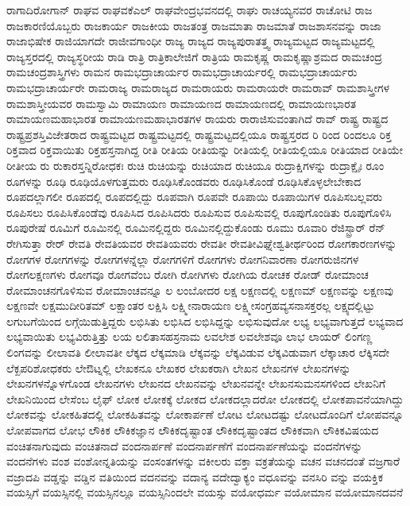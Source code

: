 {ರಾಗಾದಿರೋಗಾನ್
ರಾಘವ
ರಾಘವಕೆಎಲ್
ರಾಘವೇಂದ್ರಭವನದಲ್ಲಿ
ರಾಘು
ರಾಚಯ್ಯನವರ
ರಾಚೋಟಿ
ರಾಜ
ರಾಜಕಾರಣಿಯೊಬ್ಬರು
ರಾಜಕಾರ್ಯ
ರಾಜಕೀಯ
ರಾಜತಂತ್ರ
ರಾಜಮಾತಾ
ರಾಜಮಾತೆ
ರಾಜಶಾಸನವನ್ನು
ರಾಜಾ
ರಾಜಾಭಿಷೇಕ
ರಾಜಿಯಾಗದೇ
ರಾಜೀವಗಾಂಧೀ
ರಾಜ್ಯ
ರಾಜ್ಯದ
ರಾಜ್ಯಪುರಾತತ್ತ್ವ
ರಾಜ್ಯಮಟ್ಟದ
ರಾಜ್ಯಮಟ್ಟದಲ್ಲಿ
ರಾಜ್ಯಸ್ತರದಲ್ಲಿ
ರಾಜ್ಯಸ್ಥರೀಯ
ರಾಡಿ
ರಾತ್ರಿ
ರಾತ್ರಿಕಾಲೇಜಿಗೆ
ರಾತ್ರಿಯ
ರಾಮಕೃಷ್ಣ
ರಾಮಕೃಷ್ಣಾಶ್ರಮದ
ರಾಮಚಂದ್ರ
ರಾಮಚಂದ್ರಶಾಸ್ತ್ರಿಗಳು
ರಾಮನ
ರಾಮಭದ್ರಾಚಾರ್ಯರ
ರಾಮಭದ್ರಾಚಾರ್ಯರಲ್ಲಿ
ರಾಮಭದ್ರಾಚಾರ್ಯರು
ರಾಮಭದ್ರಾಚಾರ್ಯರೇ
ರಾಮರಾಜ್ಯ
ರಾಮರಾಜ್ಯದ
ರಾಮರಾಯರು
ರಾಮರಾಯರೇ
ರಾಮರಾವ್
ರಾಮಶಾಸ್ತ್ರೀಗಳ
ರಾಮಶಾಸ್ತ್ರೀಯವರ
ರಾಮಸ್ವಾಮಿ
ರಾಮಾಯಣ
ರಾಮಾಯಣದ
ರಾಮಾಯಣದಲ್ಲಿ
ರಾಮಾಯಣಭಾರತ
ರಾಮಾಯಣಮಹಾಭಾರತ
ರಾಮಾಯಣಮಹಾಭಾರತಗಳ
ರಾಯರು
ರಾರಾಜಿಸುವಂತಾಗಿದೆ
ರಾವ್
ರಾಷ್ಟ್ರ
ರಾಷ್ಟ್ರದ
ರಾಷ್ಟ್ರಪ್ರಶಸ್ತಿವಿಜೇತರಾದ
ರಾಷ್ಟ್ರಮಟ್ಟದ
ರಾಷ್ಟ್ರಮಟ್ಟದಲ್ಲಿ
ರಾಷ್ಟ್ರಮಟ್ಟದಲ್ಲಿಯೂ
ರಾಷ್ಟ್ರಸ್ತರದ
ರಿ
ರಿಂದ
ರಿಂದಲೂ
ರಿಕ್ತ
ರಿಕ್ತವಾದ
ರಿಕ್ತವಾಯಿತು
ರಿಕ್ತಹಸ್ತನಾಗಿದ್ದ
ರೀತಿ
ರೀತಿಯ
ರೀತಿಯನ್ನು
ರೀತಿಯಲ್ಲಿ
ರೀತಿಯಲ್ಲಿಯೂ
ರೀತಿಯಾದ
ರೀತಿಯೇ
ರೀತೀಯ
ರು
ರುಕಾರಸ್ತನ್ನಿರೋಧಕಃ
ರುಚಿ
ರುಚಿಯನ್ನು
ರುಚಿಯಾದ
ರುಚಿಯೂ
ರುದ್ರಾಕ್ಷಿಗಳನ್ನು
ರುದ್ರಾಕ್ಷೈಃ
ರೂಂ
ರೂಗಳನ್ನು
ರೂಢಿ
ರೂಢಿಯೊಳಗುತ್ತಮರು
ರೂಢಿಸಿಕೊಂಡವರು
ರೂಢಿಸಿಕೊಂಡೆ
ರೂಢಿಸಿಕೊಳ್ಳಲೇಬೇಕಾದ
ರೂಪದಲ್ಲಾಗಲೀ
ರೂಪದಲ್ಲಿ
ರೂಪದಲ್ಲಿದ್ದು
ರೂಪವಾಗಿ
ರೂಪವೇ
ರೂಪಾಯಿ
ರೂಪಾಯಿಗಳ
ರೂಪಿಸಬಲ್ಲವರು
ರೂಪಿಸಲು
ರೂಪಿಸಿಕೊಂಡೆವು
ರೂಪಿಸಿದ
ರೂಪಿಸಿದರು
ರೂಪಿಸುವ
ರೂಪಿಸುವಲ್ಲಿ
ರೂಪುಗೊಂಡಿತು
ರೂಪುಗೊಳಿಸಿ
ರೂಪುರೇಷೆ
ರೂಮಿಗೆ
ರೂಮಿನಲ್ಲಿ
ರೂಮಿನಲ್ಲಿದ್ದರು
ರೂಮಿನಲ್ಲಿದ್ದುಕೊಂಡು
ರೂಮು
ರೂವಾರಿ
ರೆಜಿಸ್ಟ್ರಾರ್
ರೆನ್
ರೇಗಿಸುತ್ತಾ
ರೇರ್
ರೇವತಿ
ರೇವತಿಯವರ
ರೇವತಿಯವರು
ರೇವತೀ
ರೇವತೀವಿಘ್ನೇಶ್ವತೀರ್ಥರಿಂದ
ರೋಗಕಾರಣಗಳನ್ನು
ರೋಗಗಳ
ರೋಗಗಳನ್ನು
ರೋಗಗಳನ್ನೆಲ್ಲಾ
ರೋಗಗಳಿಗೆ
ರೋಗಗಳು
ರೋಗನಿವಾರಣಾ
ರೋಗರುಜಿನಗಳ
ರೋಗಲಕ್ಷಣಗಳು
ರೋಗವೂ
ರೋಗವೆಂಬ
ರೋಗಿ
ರೋಗಿಗಳು
ರೋಗಿಯ
ರೋಚಕ
ರೋಡ್
ರೋಮಾಂಚ
ರೋಮಾಂಚನಗೊಳಿಸುವ
ರೋಮಾಂಚವನ್ನೂ
ಲ
ಲಂಬೋದರ
ಲಕ್ಷ
ಲಕ್ಷಣದಲ್ಲಿ
ಲಕ್ಷಣಮ್
ಲಕ್ಷಣವನ್ನು
ಲಕ್ಷಣವು
ಲಕ್ಷಣವೇ
ಲಕ್ಷಮುದೀರಿತಮ್
ಲಕ್ಷಾಂತರ
ಲಕ್ಷಿಸಿ
ಲಕ್ಷ್ಮೀನಾರಾಯಣ
ಲಕ್ಷ್ಮೀಸಂಗ್ರಹವ್ಯಸನಾಸಕ್ತರಲ್ಲ
ಲಕ್ಷ್ಯದಲ್ಲಿಟ್ಟು
ಲಗುಬಗೆಯಿಂದ
ಲಗ್ಗೆಯಿಡುತ್ತಿದ್ದರು
ಲಭಿಸಿತು
ಲಭಿಸಿದ
ಲಭಿಸಿದ್ದನ್ನು
ಲಭಿಸುವುದೋ
ಲಭ್ಯ
ಲಭ್ಯವಾಗುತ್ತದೆ
ಲಭ್ಯವಾದ
ಲಭ್ಯವಾಯಿತು
ಲಭ್ಯವಿರುತ್ತಿತ್ತು
ಲಯ
ಲಲಿತಾಸಹಸ್ರನಾಮ
ಲವಲೇಶ
ಲವಲೇಶವೂ
ಲಾಭ
ಲಾಯರ್
ಲಿಂಗಣ್ಣ
ಲಿಂಗವನ್ನು
ಲೀಲಾವತಿ
ಲೀಲಾವತೀ
ಲೆಕ್ಕದ
ಲೆಕ್ಕಮಾಡಿ
ಲೆಕ್ಕವನ್ನು
ಲೆಕ್ಕವಿಡುವ
ಲೆಕ್ಕವಿಡುವಾಗ
ಲೆಕ್ಕಾಚಾರ
ಲೆಕ್ಕಿಸದೇ
ಲೆಕ್ಖಪರಿಶೋಧಕರು
ಲೇಔಟ್ನಲ್ಲಿ
ಲೇಖಕನೂ
ಲೇಖಕರ
ಲೇಖಕರಾಗಿ
ಲೇಖನ
ಲೇಖನಗಳ
ಲೇಖನಗಳನ್ನು
ಲೇಖನಗಳನ್ನೊಳಗೊಂಡ
ಲೇಖನಗಳು
ಲೇಖನದ
ಲೇಖನವನ್ನು
ಲೇಖನವನ್ನೇ
ಲೇಖನಸುಮನಸಗಳಿಂದ
ಲೇಖನಿಗೆ
ಲೇಖನಿಯಿಂದ
ಲೇಸೆಂಬ
ಲೈಫ್
ಲೋಕ
ಲೋಕಕ್ಕೆ
ಲೋಕದ
ಲೋಕದಲ್ಲಾದರೋ
ಲೋಕದಲ್ಲಿ
ಲೋಕಪಾವನೆಯಾಗಿದ್ದು
ಲೋಕವನ್ನು
ಲೋಕಹಿತದಲ್ಲಿ
ಲೋಕಹಿತವನ್ನು
ಲೋಕಾರ್ಪಣೆ
ಲೋಟ
ಲೋಟದಷ್ಟು
ಲೋಟದೊಂದಿಗೆ
ಲೋಪವನ್ನೂ
ಲೋಪವಾಗದ
ಲೋಭ
ಲೌಕಿಕ
ಲೌಕಿಕಜ್ಞಾನ
ಲೌಕಿಕದೃಷ್ಟಾಂತ
ಲೌಕಿಕದೃಷ್ಟಾಂತದ
ಲೌಕಿಕವಾಗಿ
ಲೌಕಿಕವಿಷಯದ
ವಂಚಿತನಾಗುವುದು
ವಂಚಿತನಾದೆ
ವಂದನಾರ್ಪಣೆ
ವಂದನಾರ್ಪಣೆಗೆ
ವಂದನಾರ್ಪಣೆಯನ್ನು
ವಂದನೆಗಳನ್ನು
ವಂದನೆಗಳು
ವಂಶ
ವಂಶೋನ್ನತಿಯನ್ನು
ವಂಸಂತಗಳನ್ನು
ವಕೀಲರು
ವಕ್ತಾ
ವಕ್ರತೆಯನ್ನು
ವಚನ
ವಚನದಂತೆ
ವಜ್ರಗಾರೆ
ವಜ್ರಾದಪಿ
ವಡ್ಡನ್ನು
ವಡ್ಡಿನ
ವತಿಯಿಂದ
ವದನವನ್ನು
ವದಾನ್ಯ
ವದೇದ್ವಾಕ್ಯಂ
ವಧೂವನ್ನು
ವನಸಿರಿ
ವನ್ನು
ವಯಕ್ತಿಕ
ವಯಸ್ಸಿಗೆ
ವಯಸ್ಸಿನಲ್ಲಿ
ವಯಸ್ಸಿನಲ್ಲೂ
ವಯಸ್ಸಿನಿಂದಲೇ
ವಯಸ್ಸು
ವಯೋಧರ್ಮ
ವಯೋಮಾನ
ವಯೋಮಾನದವನೆ
}
